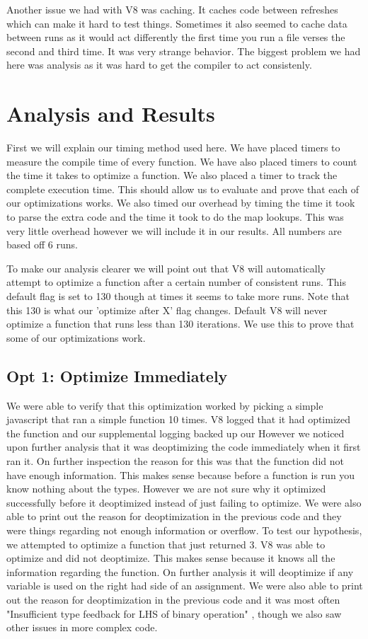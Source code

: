 \documentclass[twocolumn,showpacs,%
  nofootinbib,aps,superscriptaddress,%
  eqsecnum,prd,notitlepage,showkeys,10pt]{revtex4-1}
\begin{document}
Another issue we had with V8 was caching. It caches code between refreshes which can make it hard to test things. Sometimes it also seemed to cache data between runs as it would act differently the first time you run a file verses the second and third time. It was very strange behavior. The biggest problem we had here was analysis as it was hard to get the compiler to act consistenly. 

\section{Analysis and Results}
First we will explain our timing method used here. We have placed timers to measure the compile time of every function. We have also placed timers to count the time it takes to optimize a function. We also placed a timer to track the complete execution time. This should allow us to evaluate and prove that each of our optimizations works. We also timed our overhead by timing the time it took to parse the extra code and the time it took to do the map lookups. This was very little overhead however we will include it in our results. All numbers are based off 6 runs.

To make our analysis clearer we will point out that V8 will automatically attempt to optimize a function after a certain number of consistent runs. This default flag is set to 130 though at times it seems to take more runs. Note that this 130 is what our 'optimize after X' flag changes. Default V8 will never optimize a function that runs less than 130 iterations. We use this to prove that some of our optimizations work.

\subsection{Opt 1: Optimize Immediately}
We were able to verify that this optimization worked by picking a simple javascript that ran a simple function 10 times. V8 logged that it had optimized the function and our supplemental logging backed up our  However we noticed upon further analysis that it was deoptimizing the code immediately when it first ran it. On further inspection the reason for this was that the function did not have enough information. This makes sense because before a function is run you know nothing about the types. However we are not sure why it optimized successfully before it deoptimized instead of just failing to optimize. We were also able to print out the reason for deoptimization in the previous code and they were things regarding not enough information or overflow. To test our hypothesis, we attempted to optimize a function that just returned 3. V8 was able to optimize and did not deoptimize. This makes sense because it knows all the information regarding the function. On further analysis it will deoptimize if any variable is used on the right had side of an assignment. We were also able to print out the reason for deoptimization in the previous code and it was most often "Insufficient type feedback for LHS of binary operation" , though we also saw other issues in more complex code.
\end{document}
